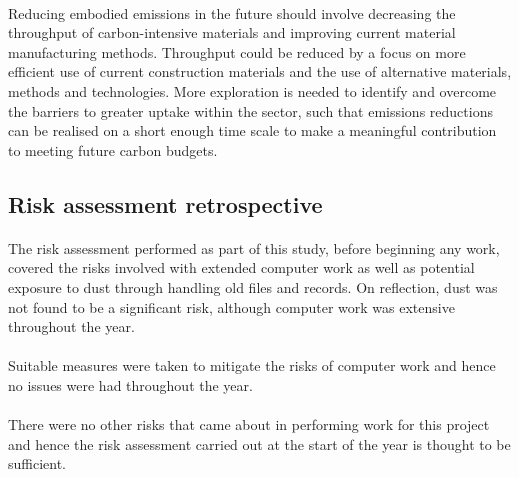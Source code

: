 \documentclass[12pt]{article}
\begin{document}
\paragraph{}
Reducing embodied emissions in the future should involve decreasing the throughput of carbon-intensive materials and improving current material manufacturing methods. Throughput could be reduced by a focus on more efficient use of current construction materials and the use of alternative materials, methods and technologies. More exploration is needed to identify and overcome the barriers to greater uptake within the sector, such that emissions reductions can be realised on a short enough time scale to make a meaningful contribution to meeting future carbon budgets.


\begingroup
\singlespacing
\small
{}

\endgroup


\begin{appendices}

\section{Risk assessment retrospective}

\paragraph{} The risk assessment performed as part of this study, before beginning any work, covered the risks involved with extended computer work as well as potential exposure to dust through handling old files and records. On reflection, dust was not found to be a significant risk, although computer work was extensive throughout the year.

\paragraph{} Suitable measures were taken to mitigate the risks of computer work and hence no issues were had throughout the year.

\paragraph{} There were no other risks that came about in performing work for this project and hence the risk assessment carried out at the start of the year is thought to be sufficient.

\end{appendices}
\end{document}
